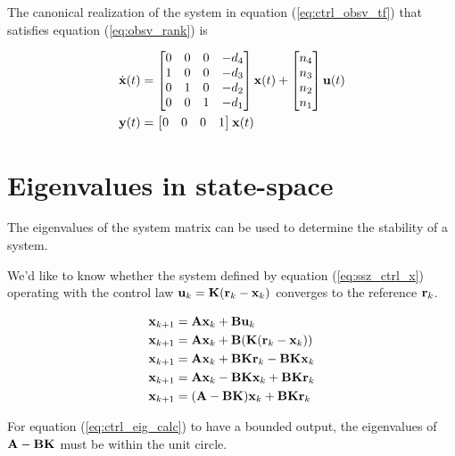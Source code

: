 The canonical \gls{realization} of the \gls{system} in equation
(\ref{eq:ctrl_obsv_tf}) that satisfies equation (\ref{eq:obsv_rank}) is

\begin{align}
  \dot{\mathbf{x}}(t) &=
  \begin{bmatrix}
    0 & 0 & 0 & -d_4 \\
    1 & 0 & 0 & -d_3 \\
    0 & 1 & 0 & -d_2 \\
    0 & 0 & 1 & -d_1
  \end{bmatrix}
  \mathbf{x}(t) +
  \begin{bmatrix}
    n_4 \\
    n_3 \\
    n_2 \\
    n_1
  \end{bmatrix}
  \mathbf{u}(t) \\
  \mathbf{y}(t) &=
  \begin{bmatrix}
    0 & 0 & 0 & 1
  \end{bmatrix}
  \mathbf{x}(t)
\end{align}

\section{Eigenvalues in state-space}

The eigenvalues of the system matrix can be used to determine the stability of a
\gls{system}.

We'd like to know whether the \gls{system} defined by equation
(\ref{eq:ssz_ctrl_x}) operating with the \gls{control law}
$\mathbf{u}_k = \mathbf{K}(\mathbf{r}_k - \mathbf{x}_k)$ converges to the \gls{reference}
$\mathbf{r}_k$.

\begin{align}
  \mathbf{x}_{k+1} &= \mathbf{A}\mathbf{x}_k + \mathbf{B}\mathbf{u}_k \nonumber \\
  \mathbf{x}_{k+1} &= \mathbf{A}\mathbf{x}_k + \mathbf{B}(\mathbf{K}(\mathbf{r}_k - \mathbf{x}_k))
    \nonumber \\
  \mathbf{x}_{k+1} &= \mathbf{A}\mathbf{x}_k + \mathbf{B}\mathbf{K}\mathbf{r}_k -
    \mathbf{B}\mathbf{K}\mathbf{x}_k \nonumber \\
  \mathbf{x}_{k+1} &= \mathbf{A}\mathbf{x}_k - \mathbf{B}\mathbf{K}\mathbf{x}_k +
    \mathbf{B}\mathbf{K}\mathbf{r}_k \nonumber \\
  \mathbf{x}_{k+1} &= (\mathbf{A} - \mathbf{B}\mathbf{K})\mathbf{x}_k +
    \mathbf{B}\mathbf{K}\mathbf{r}_k \label{eq:ctrl_eig_calc}
\end{align}

For equation (\ref{eq:ctrl_eig_calc}) to have a bounded output, the eigenvalues
of $\mathbf{A} - \mathbf{B}\mathbf{K}$ must be within the unit circle.

